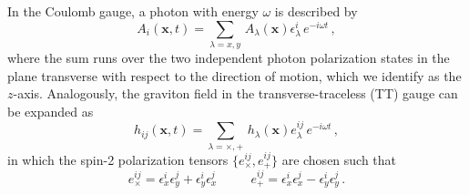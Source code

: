 \documentclass[twocolumn,superscriptaddress,floatfix,preprintnumbers, nofootinbib,hyperref]{revtex4-2}
\begin{document}
In the Coulomb gauge, a photon with energy $\omega$ is described by
\begin{equation}
    A_i(\mathbf{x},t)=\sum_{\lambda=x,y}\,A_{\lambda}(\mathbf{x})\epsilon^i_{\lambda}\,e^{-i\omega t}\,,
\end{equation}
where the sum runs over the two independent photon polarization states in the plane transverse with respect to the direction of motion, which we identify as the $z$-axis. Analogously, the graviton field in the transverse-traceless (TT) gauge can be expanded as
\begin{equation}
    h_{ij}(\mathbf{x}, t)=\sum_{\lambda=\times,+}\,h_{\lambda}(\mathbf{x})e^{ij}_{\lambda}\,e^{-i\omega t}\,,
\end{equation}
in which the spin-2 polarization tensors $\{e^{ij}_{\times},e^{ij}_{+}\}$ are chosen such that
\begin{equation}            
    e^{ij}_{\times}=\epsilon^i_{x}\epsilon^j_{y}+\epsilon^i_{y}\epsilon^j_{x}\,\,\,\,\,\,\,\,\,\,\,\,\,\,\,\,
    e^{ij}_{+}=\epsilon^i_{x}\epsilon^j_{x}-\epsilon^i_{y}\epsilon^j_{y}\,.
\end{equation}
\end{document}

